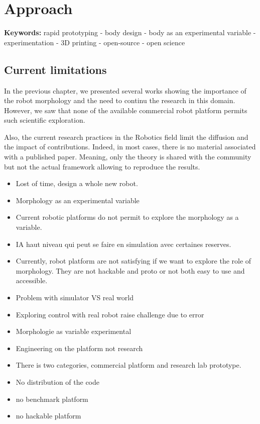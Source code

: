
\chapter{Approach}

\textbf{Keywords:} rapid prototyping - body design - body as an experimental variable - experimentation - 3D printing - open-source - open science

\section{Current limitations}

In the previous chapter, we presented several works showing the importance of the robot morphology and the need to continu the research in this domain. However, we saw that none of the available commercial robot platform permits such scientific exploration.

Also, the current research practices in the Robotics field limit the diffusion and the impact of contributions. Indeed, in most cases, there is no material associated with a published paper. Meaning, only the theory is shared with the community but not the actual framework allowing to reproduce the results.

\begin{itemize}
    \item Lost of time, design a whole new robot.
    \item Morphology as an experimental variable
    \item Current robotic platforms do not permit to explore the morphology as a variable.
    \item IA haut niveau qui peut se faire en simulation avec certaines reserves.
    \item Currently, robot platform are not satisfying if we want to explore the role of morphology. They are not hackable and proto or not both easy to use and accessible.
    \item Problem with simulator VS real world
    \item Exploring control with real robot raise challenge due to error
    \item Morphologie as variable experimental
    \item Engineering on the platform not research
    \item There is two categories, commercial platform and research lab prototype.
    \item No distribution of the code
    \item no benchmark platform
    \item no hackable platform
\end{itemize}

